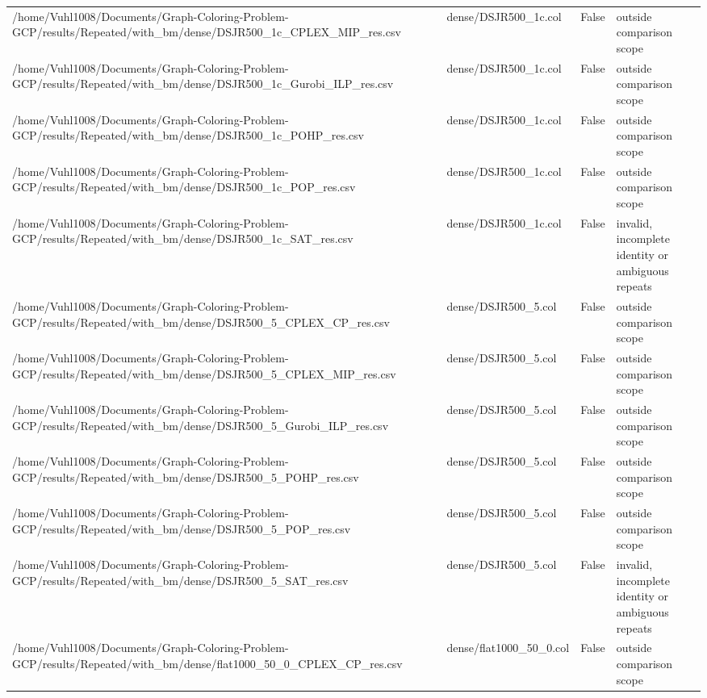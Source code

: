 \begin{table}[htbp]
\begin{tabular}{llll}
/home/Vuhl1008/Documents/Graph-Coloring-Problem-GCP/results/Repeated/with\_bm/dense/DSJR500\_1c\_CPLEX\_MIP\_res.csv & dense/DSJR500\_1c.col & False & outside comparison scope \\
/home/Vuhl1008/Documents/Graph-Coloring-Problem-GCP/results/Repeated/with\_bm/dense/DSJR500\_1c\_Gurobi\_ILP\_res.csv & dense/DSJR500\_1c.col & False & outside comparison scope \\
/home/Vuhl1008/Documents/Graph-Coloring-Problem-GCP/results/Repeated/with\_bm/dense/DSJR500\_1c\_POHP\_res.csv & dense/DSJR500\_1c.col & False & outside comparison scope \\
/home/Vuhl1008/Documents/Graph-Coloring-Problem-GCP/results/Repeated/with\_bm/dense/DSJR500\_1c\_POP\_res.csv & dense/DSJR500\_1c.col & False & outside comparison scope \\
/home/Vuhl1008/Documents/Graph-Coloring-Problem-GCP/results/Repeated/with\_bm/dense/DSJR500\_1c\_SAT\_res.csv & dense/DSJR500\_1c.col & False & invalid, incomplete identity or ambiguous repeats \\
/home/Vuhl1008/Documents/Graph-Coloring-Problem-GCP/results/Repeated/with\_bm/dense/DSJR500\_5\_CPLEX\_CP\_res.csv & dense/DSJR500\_5.col & False & outside comparison scope \\
/home/Vuhl1008/Documents/Graph-Coloring-Problem-GCP/results/Repeated/with\_bm/dense/DSJR500\_5\_CPLEX\_MIP\_res.csv & dense/DSJR500\_5.col & False & outside comparison scope \\
/home/Vuhl1008/Documents/Graph-Coloring-Problem-GCP/results/Repeated/with\_bm/dense/DSJR500\_5\_Gurobi\_ILP\_res.csv & dense/DSJR500\_5.col & False & outside comparison scope \\
/home/Vuhl1008/Documents/Graph-Coloring-Problem-GCP/results/Repeated/with\_bm/dense/DSJR500\_5\_POHP\_res.csv & dense/DSJR500\_5.col & False & outside comparison scope \\
/home/Vuhl1008/Documents/Graph-Coloring-Problem-GCP/results/Repeated/with\_bm/dense/DSJR500\_5\_POP\_res.csv & dense/DSJR500\_5.col & False & outside comparison scope \\
/home/Vuhl1008/Documents/Graph-Coloring-Problem-GCP/results/Repeated/with\_bm/dense/DSJR500\_5\_SAT\_res.csv & dense/DSJR500\_5.col & False & invalid, incomplete identity or ambiguous repeats \\
/home/Vuhl1008/Documents/Graph-Coloring-Problem-GCP/results/Repeated/with\_bm/dense/flat1000\_50\_0\_CPLEX\_CP\_res.csv & dense/flat1000\_50\_0.col & False & outside comparison scope \\

\end{tabular}
\end{table}
